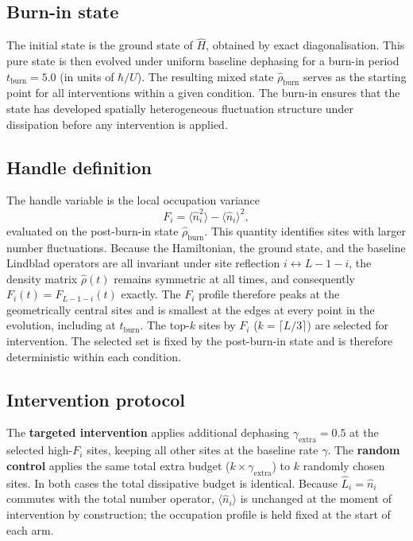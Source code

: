 \documentclass[aps,prresearch,reprint,amsmath,amssymb,longbibliography,floatfix]{revtex4-2}
\newcommand{\Fi}{F_i}
\newcommand{\nop}{\hat{n}}
\newcommand{\rhohat}{\hat{\rho}}
\newcommand{\Lop}{\hat{L}}
\begin{document}
\subsection{Burn-in state}

The initial state is the ground state of $\hat{H}$, obtained by exact
diagonalisation.
This pure state is then evolved under uniform baseline dephasing for a
burn-in period $t_{\mathrm{burn}}=5.0$ (in units of $\hbar/U$).
The resulting mixed state $\rhohat_{\mathrm{burn}}$ serves as the starting
point for all interventions within a given condition.
The burn-in ensures that the state has developed spatially heterogeneous
fluctuation structure under dissipation before any intervention is applied.

\subsection{Handle definition}

The handle variable is the local occupation variance
\begin{equation}
\label{eq:Fi}
\Fi = \langle\nop_i^2\rangle - \langle\nop_i\rangle^2,
\end{equation}
evaluated on the post-burn-in state $\rhohat_{\mathrm{burn}}$.
This quantity identifies sites with larger number fluctuations.
Because the Hamiltonian, the ground state, and the baseline Lindblad
operators are all invariant under site reflection $i\leftrightarrow L-1-i$,
the density matrix $\rhohat(t)$ remains symmetric at all times, and
consequently $\Fi(t) = F_{L-1-i}(t)$ exactly.
The $\Fi$ profile therefore peaks at the geometrically central sites and
is smallest at the edges at every point in the evolution, including at
$t_{\mathrm{burn}}$.
The top-$k$ sites by $\Fi$ ($k=\lceil L/3\rceil$) are selected for
intervention.
The selected set is fixed by the post-burn-in state and is therefore
deterministic within each condition.

\subsection{Intervention protocol}

The \textbf{targeted intervention} applies additional dephasing
$\gamma_{\mathrm{extra}}=0.5$ at the selected high-$\Fi$ sites, keeping
all other sites at the baseline rate $\gamma$.
The \textbf{random control} applies the same total extra budget
($k\times\gamma_{\mathrm{extra}}$) to $k$ randomly chosen sites.
In both cases the total dissipative budget is identical.
Because $\Lop_i=\nop_i$ commutes with the total number operator,
$\langle\nop_i\rangle$ is unchanged at the moment of intervention by
construction; the occupation profile is held fixed at the start of each arm.
\end{document}
